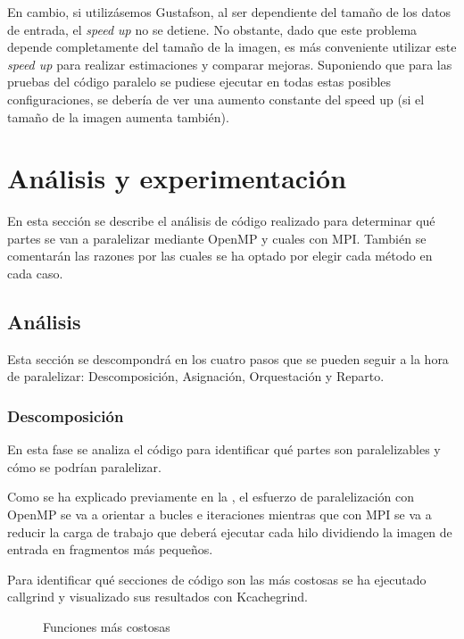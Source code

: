 \documentclass[12pt]{report} %
\begin{document}
En cambio, si utilizásemos Gustafson, al ser dependiente del tamaño de los datos de entrada, el
\textit{speed up} no se detiene. No obstante, dado que este problema depende completamente del tamaño
de la imagen, es más conveniente utilizar este \textit{speed up} para realizar estimaciones y comparar
mejoras. Suponiendo que para las pruebas del código paralelo se pudiese ejecutar en todas estas posibles
configuraciones, se debería de ver una aumento constante del speed up (si el tamaño de la imagen aumenta
también).


\chapter{Análisis y experimentación}

En esta sección se describe el análisis de código realizado para determinar qué partes se van a
paralelizar mediante OpenMP y cuales con MPI. También se comentarán las razones por las cuales se ha optado
por elegir cada método en cada caso.

\section{Análisis}

Esta sección se descompondrá en los cuatro pasos que se pueden seguir a la hora de paralelizar:
Descomposición, Asignación, Orquestación y Reparto.

\subsection{Descomposición}

En esta fase se analiza el código para identificar qué partes son paralelizables y cómo se podrían paralelizar.

Como se ha explicado previamente en la , el esfuerzo de paralelización con OpenMP se va
a orientar a bucles e iteraciones mientras que con MPI se va a reducir la carga de trabajo que deberá ejecutar
cada hilo dividiendo la imagen de entrada en fragmentos más pequeños.

Para identificar qué secciones de código son las más costosas se ha ejecutado callgrind y visualizado sus
resultados con Kcachegrind.

\begin{figure}[H]
    \caption{Funciones más costosas}
    \label{fig:kcachegrind}
\end{figure}
\end{document}
